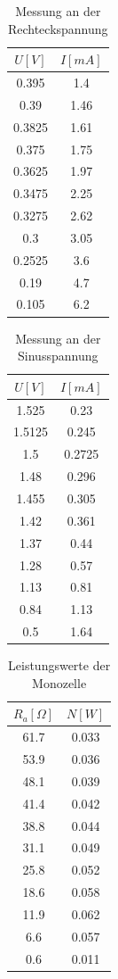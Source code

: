 \documentclass[11pt]{article}
\begin{document}
 
 \begin{table}[h]
 \centering

 \begin{tabular}{|c|c|}
  \hline
  $U[V]$ & $I[mA]$  \\
  \hline
  0.395 & 1.4 \\
  0.39 & 1.46 \\
  0.3825& 1.61 \\
  0.375 & 1.75 \\
  0.3625 & 1.97\\
  0.3475 & 2.25\\
  0.3275 & 2.62 \\
  0.3 & 3.05\\
  0.2525 & 3.6\\
  0.19 & 4.7\\
  0.105 & 6.2\\
  \hline
 \end{tabular}
  \caption{Messung an der Rechteckspannung}
 \label{Messung 3}
 \end{table}
 
 
 \begin{table}[h]
 \centering

 \begin{tabular}{|c|c|}
  \hline
  $U[V]$ & $I[mA]$  \\
  \hline
  1.525 & 0.23 \\
  1.5125 & 0.245 \\
  1.5& 0.2725 \\
  1.48 & 0.296 \\
  1.455 & 0.305\\
  1.42& 0.361\\
  1.37 & 0.44 \\
  1.28 & 0.57\\
  1.13 & 0.81\\
  0.84 & 1.13\\
  0.5 & 1.64\\
  \hline
 \end{tabular}
  \caption{Messung an der Sinusspannung}
 \label{Messung 4}
 \end{table}
 
 \begin{table}
 \centering
 \begin{tabular}{|c|c|}
\hline
$R_a [\Omega]$ & $N [W]$ \\
\hline
61.7 & 0.033\\
53.9 & 0.036\\
48.1 & 0.039\\
41.4 & 0.042\\
38.8 & 0.044\\
31.1 & 0.049\\
25.8 & 0.052\\
18.6 & 0.058\\
11.9 & 0.062\\
6.6 & 0.057\\
0.6 & 0.011\\
\hline
\end{tabular}
\caption{Leistungswerte der Monozelle}
\label{leistung}
\end{table}
\end{document}
